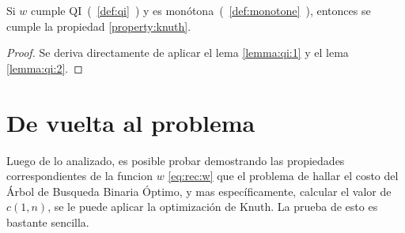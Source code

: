 \documentclass[spanish]{llncs}
\begin{document}
\begin{theorem}
	\label{theorem:qi}
	Si $w$ cumple QI~(~\ref{def:qi}~) y es monótona~(~\ref{def:monotone}~), entonces
	se cumple la propiedad \ref{property:knuth}.
\end{theorem}

\begin{proof}
	Se deriva directamente de aplicar el lema \ref{lemma:qi:1} y el lema \ref{lemma:qi:2}.
\end{proof}

\section{De vuelta al problema}
Luego de lo analizado, es posible probar demostrando las propiedades
correspondientes de la funcion $w$ \eqref{eq:rec:w} que el problema de hallar el costo
del Árbol de Busqueda Binaria Óptimo, y mas específicamente, calcular el valor de $c(1,n)$,
se le puede aplicar la optimización de Knuth. La prueba de esto es bastante sencilla.
\end{document}
